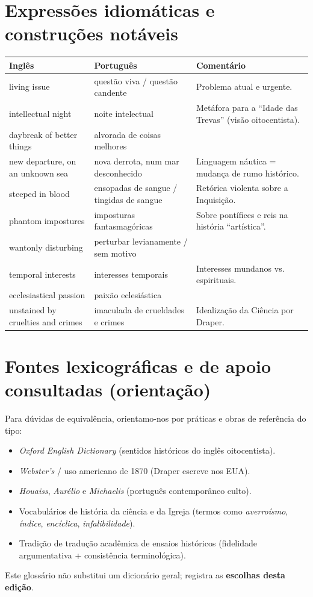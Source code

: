\documentclass[11pt,a5paper,twoside,openany]{book}
\begin{document}
\section*{Expressões idiomáticas e construções notáveis}
\begin{longtable}{p{} | p{} | p{}}
Inglês & Português & Comentário \\
\hline
living issue & questão viva / questão candente & Problema atual e urgente. \\
intellectual night & noite intelectual & Metáfora para a “Idade das Trevas” (visão oitocentista). \\
daybreak of better things & alvorada de coisas melhores &  \\
new departure, on an unknown sea & nova derrota, num mar desconhecido & Linguagem náutica = mudança de rumo histórico. \\
steeped in blood & ensopadas de sangue / tingidas de sangue & Retórica violenta sobre a Inquisição. \\
phantom impostures & imposturas fantasmagóricas & Sobre pontífices e reis na história “artística”. \\
wantonly disturbing & perturbar levianamente / sem motivo &  \\
temporal interests & interesses temporais & Interesses mundanos vs. espirituais. \\
ecclesiastical passion & paixão eclesiástica &  \\
unstained by cruelties and crimes & imaculada de crueldades e crimes & Idealização da Ciência por Draper. \\
\end{longtable}

\section*{Fontes lexicográficas e de apoio consultadas (orientação)}
Para dúvidas de equivalência, orientamo-nos por práticas e obras de referência do tipo:

\begin{itemize}
\item \textit{Oxford English Dictionary} (sentidos históricos do inglês oitocentista).
\item \textit{Webster’s} / uso americano de 1870 (Draper escreve nos EUA).
\item \textit{Houaiss}, \textit{Aurélio} e \textit{Michaelis} (português contemporâneo culto).
\item Vocabulários de história da ciência e da Igreja (termos como \textit{averroísmo}, \textit{índice}, \textit{encíclica}, \textit{infalibilidade}).
\item Tradição de tradução acadêmica de ensaios históricos (fidelidade argumentativa + consistência terminológica).
\end{itemize}
Este glossário não substitui um dicionário geral; registra as \textbf{escolhas desta edição}.
\end{document}
